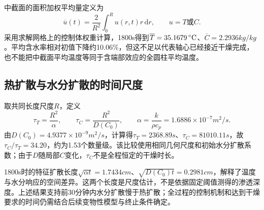 中截面的面积加权平均量定义为
\begin{equation}
\overline u(t)=\frac{2}{R^2}\int_0^R u(r,t)r\,\mathrm{d}r,\qquad u=T\text{或}C.
\label{eq:radial-average}
\end{equation}
采用求解网格上的控制体权重计算，1800\unit{s}得到$\overline T=35.1679\celsius$、$\overline C=2.2936\unit{kg/kg}$。平均含水率相对初值下降约10.06\%，但这不足以代表轴心已经接近干燥完成，也不能把中截面平均温度等同于含端部效应的全圆柱平均温度。

\subsection{热扩散与水分扩散的时间尺度}
取共同长度尺度$R$，定义
\begin{equation}
\tau_T=\frac{R^2}{\alpha},\qquad
\tau_C=\frac{R^2}{D(C_0)},\qquad
\alpha=\frac{k}{\rho c_p}=1.6886\times10^{-7}\unit{m^2/s}.
\label{eq:diffusion-times}
\end{equation}
由$D(C_0)=4.9377\times10^{-9}\unit{m^2/s}$，计算得$\tau_T=2368.89\unit{s}$、$\tau_C=81010.11\unit{s}$，故$\tau_C/\tau_T=34.20$，约为1.53个数量级。该比较使用相同几何尺度和初始水分扩散系数；由于$D$随局部$C$变化，$\tau_C$不是全程恒定的干燥时长。

1800\unit{s}时的特征扩散长度$\sqrt{\alpha t}=1.7434\unit{cm}$、$\sqrt{D(C_0)t}=0.2981\unit{cm}$，解释了温度与水分响应的空间差异。这两个长度是尺度估计，不是依据固定阈值测得的渗透深度。上述结果支持前30分钟内水分扩散慢于热扩散；全过程的控制机制和达到干燥要求的时间仍需结合后续变物性模型与终止条件确定。
\FloatBarrier

